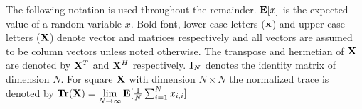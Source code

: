 The following notation is used throughout the remainder. 
$\mathop{\bf E{}}[x]$ is the expected value of a random variable $x$.
Bold font, lower-case letters ($\mathbf{x}$) and upper-case letters ($\mathbf{X}$) denote vector and matrices respectively and all vectors are assumed to be column vectors unless noted otherwise. 
The transpose and hermetian of $\mathbf{X}$ are denoted by $\mathbf{X}^T$ and $\mathbf{X}^H$ respectively.
$\mathbf{I}_N$ denotes the identity matrix of dimension $N$.
For square $\mathbf{X}$ with dimension $N\times N$ the normalized trace is denoted by $\mathop{\bf Tr}(\mathbf{X})  = \underset{N \rightarrow \infty}{\text{lim}}
\mathop{\bf E{}}[\frac{1}{N}\sum_{i=1}^N x_{i,i}]$